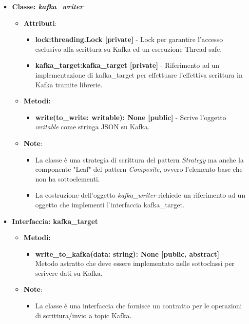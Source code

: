 \begin{itemize}
\begin{itemize}
\begin{itemize}
        \end{itemize}
    \end{itemize}
    \item{\textbf{Classe: \textit{kafka\_writer}}}
    \begin{itemize}
    \item\textbf{Attributi}:
        \begin{itemize}
        \item \textbf{lock:threading.Lock [private]} - Lock per garantire l'accesso esclusivo alla scrittura su Kafka ed un esecuzione Thread safe.
        \item \textbf{kafka\_target:kafka\_target [private]} - Riferimento ad un implementazione di kafka\_target per effettuare l'effettiva scrittura in Kafka tramite librerie.
    \end{itemize}
    \item \textbf{Metodi: }
    \begin{itemize}
        \item \textbf{write(to\_write: writable): None [public]} - Scrive l'oggetto \textit{writable} come stringa JSON su Kafka.
    \end{itemize}
    \item\textbf{Note}:
        \begin{itemize}
            \item La classe è una strategia di scrittura del pattern \textit{Strategy} ma anche la componente "Leaf" del pattern \textit{Composite}, ovvero l'elemento base che non ha sottoelementi.
            \item La costruzione dell'oggetto \textit{kafka\_writer} richiede un riferimento ad un oggetto che implementi l'interfaccia kafka\_target.
        \end{itemize}
    \end{itemize}
    \item{\textbf{Interfaccia: kafka\_target}}
    \begin{itemize}
        \item \textbf{Metodi: }
        \begin{itemize}
            \item \textbf{write\_to\_kafka(data: string): None [public, abstract]} - Metodo astratto che deve essere implementato nelle sottoclassi per scrivere dati su Kafka.
        \end{itemize}
        \item\textbf{Note}:
        \begin{itemize}
            \item La classe è una interfaccia che fornisce un contratto per le operazioni di scrittura/invio a topic Kafka.

\end{itemize}
\end{itemize}
\end{itemize}
